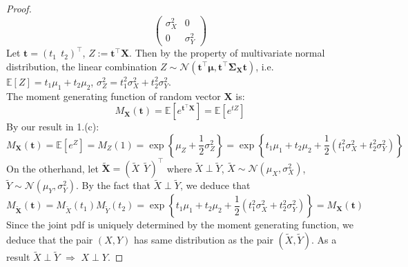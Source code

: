 \documentclass[a4paper, 10pt]{article}
\theoremstyle{definition}
\theoremstyle{hSol}
\begin{document}
\begin{proof}
$$\begin{pmatrix}
	\sigma_X^2 & 0\\
	0 & \sigma_Y^2
\end{pmatrix}
$$
Let $\bm{t} = (t_1~~t_2)^{\top}$, $Z:= \bm{t}^{\top}\bm{X}$. Then by the property of multivariate normal distribution, the linear combination $Z\sim \mathcal{N}(\bm{t}^{\top}\bm{\mu}, \bm{t}^{\top}\bm{\Sigma_{\bm{X}}\bm{t}})$, i.e. $\mathbb{E}\left[Z\right]=t_1\mu_1 + t_2 \mu_2$, $\sigma_Z^2 = t_1^2 \sigma_X^2 + t_2^2 \sigma_Y^2$. \\
The moment generating function of random vector $\bm{X}$ is: 
$$M_{\bm{X}}(\bm{t}) = \mathbb{E}\left[e^{\bm{t}^{\top}\bm{X}}\right] = \mathbb{E}\left[e^{tZ}\right]$$
By our result in 1.(c): 
$$
M_{\bm{X}}(\bm{t}) = \mathbb{E}\left[e^{Z}\right] = M_Z(1) = \exp\left\{\mu_Z + \frac{1}{2}\sigma_Z^2\right\} = \exp\left\{t_1\mu_1 + t_2 \mu_2 + \frac{1}{2}(t_1^2 \sigma_X^2 + t_2^2 \sigma_Y^2)\right\}
$$
On the otherhand, let $\tilde{\bm{X}} = (\tilde{X}~~\tilde{Y})^{\top}$ where $\tilde{X}\perp\tilde{Y}$, $\tilde{X}\sim \mathcal{N}(\mu_X, \sigma_X^2)$, $\tilde{Y}\sim \mathcal{N}(\mu_Y, \sigma_Y^2)$. By the fact that $\tilde{X}\perp \tilde{Y}$, we deduce that 
$$
M_{\tilde{\bm{X}}}(\bm{t}) = M_{\tilde{X}}(t_1) M_{\tilde{Y}}(t_2) = \exp\left\{t_1\mu_1 + t_2 \mu_2 + \frac{1}{2}(t_1^2 \sigma_X^2 + t_2^2 \sigma_Y^2)\right\} = M_{\bm{X}}(\bm{t})
$$
Since the joint pdf is uniquely determined by the moment generating function, we deduce that the pair $(X,Y)$ has same distribution as the pair $(\tilde{X},\tilde{Y})$. As a result $\tilde{X}\perp \tilde{Y}$ $\Rightarrow$ $X\perp Y$.

\end{proof}
\end{document}
